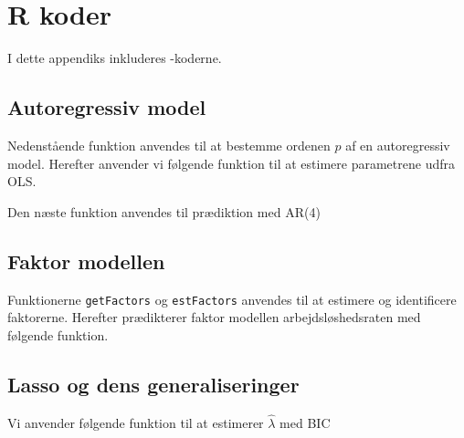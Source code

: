 \chapter{R koder} \label{app:r_koder}
I dette appendiks inkluderes \Rlang-koderne. 

\section{Autoregressiv model} \label{sec:auto}
Nedenstående funktion anvendes til at bestemme ordenen $p$ af en autoregressiv model.  
%
Herefter anvender vi følgende funktion til at estimere parametrene udfra OLS. 

Den næste funktion anvendes til prædiktion med AR(4) 

\section{Faktor modellen} \label{sec:faktor}
Funktionerne \texttt{getFactors} og \texttt{estFactors} anvendes til at estimere og identificere faktorerne. 
%
%
Herefter prædikterer faktor modellen arbejdsløshedsraten med følgende funktion.


\section{Lasso og dens generaliseringer} \label{sec:lasso}


Vi anvender følgende funktion til at estimerer $\widehat{\lambda}$ med BIC


